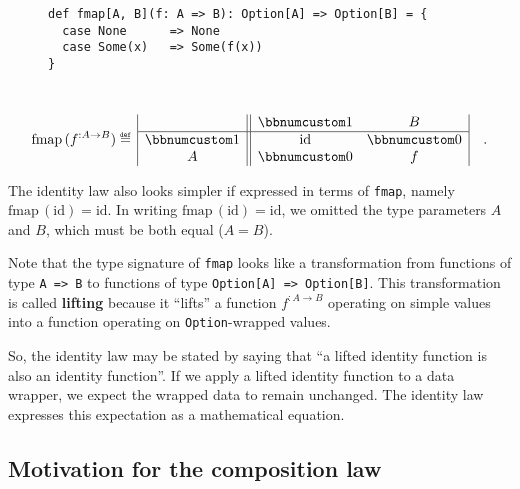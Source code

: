 \begin{wrapfigure}{l}{0.55\columnwidth}%
\vspace{-0\baselineskip}
\begin{lstlisting}
def fmap[A, B](f: A => B): Option[A] => Option[B] = {
  case None      => None
  case Some(x)   => Some(f(x))
}
\end{lstlisting}
\vspace{-2\baselineskip}
\end{wrapfigure}%

~\vspace{-0.7\baselineskip}
\begin{equation}
\text{fmap}\,(f^{:A\rightarrow B})\triangleq\,\begin{array}{|c||cc|}
 & \bbnum 1 & B\\
\hline \bbnum 1 & \text{id} & \bbnum 0\\
A & \bbnum 0 & f
\end{array}\quad.\label{eq:f-def-opt-fmap-matrix-notation}
\end{equation}
\vspace{-0.5\baselineskip}

The identity law also looks simpler if expressed in terms of \lstinline!fmap!,
namely $\text{fmap}\,(\text{id})=\text{id}$. In writing $\text{fmap}\,(\text{id})=\text{id}$,
we omitted the type parameters $A$ and $B$, which must be both equal
($A=B$).

Note that the type signature of \lstinline!fmap! looks like a transformation
from functions of type \lstinline!A => B! to functions of type \lstinline!Option[A] => Option[B]!.
This transformation is called \textbf{lifting} because
it \textsf{``}lifts\textsf{''} a function $f^{:A\rightarrow B}$ operating on simple
values into a function operating on \lstinline!Option!-wrapped values. 

So, the identity law may be stated by saying that \textsf{``}a lifted identity
function is also an identity function\textsf{''}. If we apply a lifted identity
function to a data wrapper, we expect the wrapped data to remain unchanged.
The identity law expresses this expectation as a mathematical equation.

\subsection{Motivation for the composition law}

